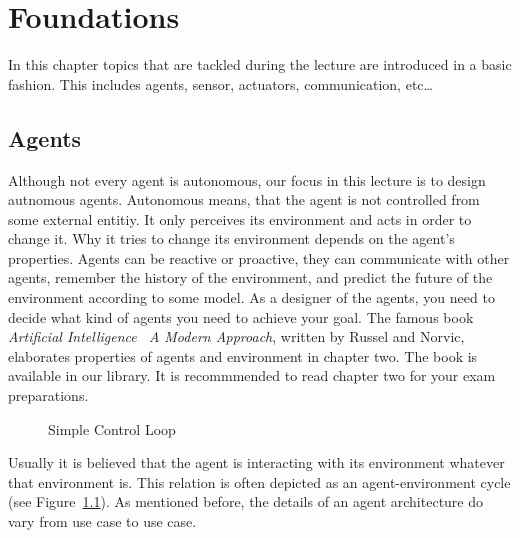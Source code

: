 \chapter{Foundations}
\label{chap:foundations}

In this chapter topics that are tackled during the lecture are introduced in a basic fashion. This includes agents, sensor, actuators, communication, etc\dots

\section{Agents}
\label{sec:agents}

Although not every agent is autonomous, our focus in this lecture is to design autnomous agents. Autonomous means, that the agent is not controlled from some external entitiy. It only perceives its environment and acts in order to change it. Why it tries to change its environment depends on the agent's properties. Agents can be reactive or proactive, they can communicate with other agents, remember the history of the environment, and predict the future of the environment according to some model. As a designer of the agents, you need to decide what kind of agents you need to achieve your goal. The famous book \emph{Artificial Intelligence \textendash\ A Modern Approach}, written by Russel and Norvic, elaborates properties of agents and environment in chapter two. The book is available in our library. It is recommmended to read chapter two for your exam preparations.

\begin{figure}[htbp]
  \centering
  \caption{Simple Control Loop}
  \label{fig:simplecontrolloop}
\end{figure}

Usually it is believed that the agent is interacting with its environment \textendash whatever that environment is. This relation is often depicted as an agent-environment cycle (see Figure~\ref{fig:simplecontrolloop}). As mentioned before, the details of an agent architecture do vary from use case to use case.

